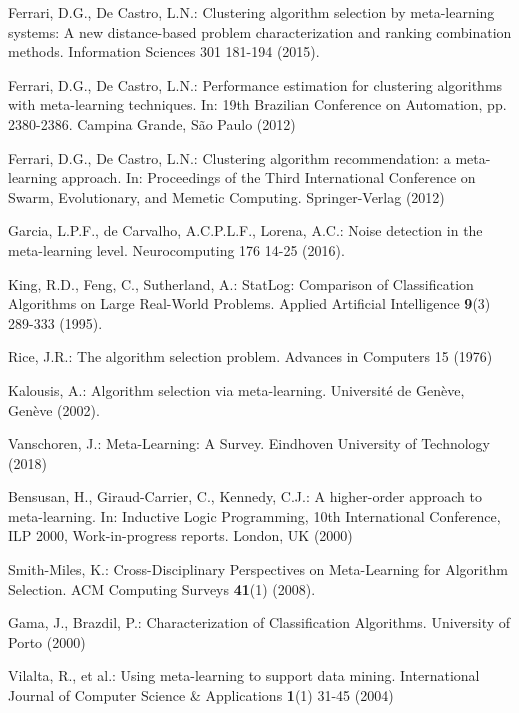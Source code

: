 \documentclass[runningheads]{llncs}
\begin{document}
\begin{thebibliography}{8}

Ferrari, D.G., De Castro, L.N.: Clustering algorithm selection by meta-learning systems: A new distance-based problem characterization and ranking combination methods. Information Sciences 301 181-194 (2015). 

Ferrari, D.G., De Castro, L.N.: Performance estimation for clustering algorithms with meta-learning techniques. In: 19th Brazilian Conference on Automation, pp. 2380-2386. Campina Grande, São Paulo (2012)

Ferrari, D.G., De Castro, L.N.: Clustering algorithm recommendation: a meta-learning approach. In: Proceedings of the Third International Conference on Swarm, Evolutionary, and Memetic Computing. Springer-Verlag (2012)

Garcia, L.P.F., de Carvalho, A.C.P.L.F., Lorena, A.C.: Noise detection in the meta-learning level. Neurocomputing 176 14-25 (2016). 

King, R.D., Feng, C., Sutherland, A.: StatLog: Comparison of Classification Algorithms on Large Real-World Problems. Applied Artificial Intelligence \textbf{9}(3) 289-333 (1995). 

Rice, J.R.: The algorithm selection problem. Advances in Computers 15 (1976)

Kalousis, A.: Algorithm selection via meta-learning. Université de Genève, Genève (2002). 

Vanschoren, J.: Meta-Learning: A Survey. Eindhoven University of Technology (2018)

Bensusan, H., Giraud-Carrier, C., Kennedy, C.J.: A higher-order approach to meta-learning. In: Inductive Logic Programming, 10th International Conference, ILP 2000, Work-in-progress reports. London, UK (2000)

Smith-Miles, K.: Cross-Disciplinary Perspectives on Meta-Learning for Algorithm Selection. ACM Computing Surveys \textbf{41}(1) (2008). 

Gama, J., Brazdil, P.: Characterization of Classification Algorithms. University of Porto (2000)

Vilalta, R., et al.: Using meta-learning to support data mining. International Journal of Computer Science & Applications \textbf{1}(1) 31-45 (2004)


\end{thebibliography}
\end{document}
